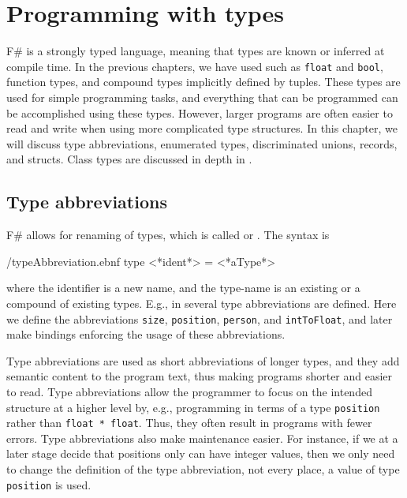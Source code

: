 \chapter{Programming with types}
\label{chap:type}
F\# is a strongly typed language, meaning that types are known or inferred at compile time. In the previous chapters, we have used  such as \lstinline{float} and \lstinline{bool},  function types, and compound types implicitly defined by tuples. These types are used for simple programming tasks, and everything that can be programmed can be accomplished using these types. However, larger programs are often easier to read and write when using more complicated type structures. In this chapter, we will discuss type abbreviations, enumerated types, discriminated unions, records, and structs. Class types are discussed in depth in .

\section{Type abbreviations}
\label{sec:typeAbbreviations}
F\# allows for renaming of types, which is called  or . The syntax is
%
\begin{verbatimwrite}{\ebnf/typeAbbreviation.ebnf}
type <*ident*> = <*aType*>
\end{verbatimwrite}
%
where the identifier is a new name, and the type-name is an existing or a compound of existing types. E.g., in  several type abbreviations are defined.
%
%
Here we define the abbreviations \lstinline{size}, \lstinline{position}, \lstinline{person}, and \lstinline{intToFloat}, and later make bindings enforcing the usage of these abbreviations.

Type abbreviations are used as short abbreviations of longer types, and they add semantic content to the program text, thus making programs shorter and easier to read. Type abbreviations allow the programmer to focus on the intended structure at a higher level by, e.g., programming in terms of a type \lstinline{position} rather than \lstinline{float * float}. Thus, they often result in programs with fewer errors. Type abbreviations also make maintenance easier. For instance, if we at a later stage decide that positions only can have integer values, then we only need to change the definition of the type abbreviation, not every place, a value of type \lstinline{position} is used.

